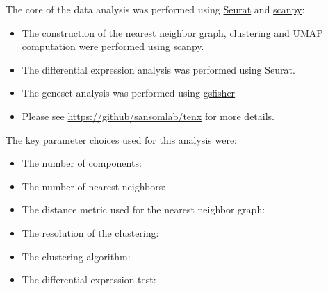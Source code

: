 The core of the data analysis was performed using \href{http://satijalab.org/seurat/}{Seurat} and \href{https://scanpy.readthedocs.io/}{scanpy}:

\begin{itemize}
\item The construction of the nearest neighbor graph, clustering and UMAP computation were performed using scanpy.
\item The differential expression analysis was performed using Seurat.
\item The geneset analysis was performed using \href{https://github.com/sansomlab/gsfisher}{gsfisher}
\item Please see \href{https://github.com/sansomlab/tenx}{https://github/sansomlab/tenx} for more details.
\end{itemize}

The key parameter choices used for this analysis were:

\begin{itemize}
\item The number of \reductionType{} components: \nPCs
\item The number of nearest neighbors: \nnK
\item The distance metric used for the nearest neighbor graph: \nnMetric
\item The resolution of the clustering: \resolution
\item The clustering algorithm: \clusteringAlgorithm
\item The differential expression test: \deTest
\end{itemize}



